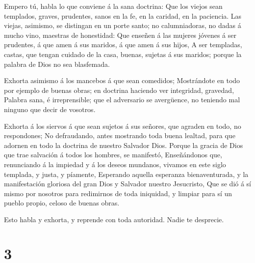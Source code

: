  Empero tú, habla lo que conviene á la sana doctrina:
 Que los viejos sean templados, graves, prudentes, sanos en
la fe, en la caridad, en la paciencia.  Las viejas,
asimismo, se distingan en un porte santo; no calumniadoras, no dadas á
mucho vino, maestras de honestidad:  Que enseñen á las
mujeres jóvenes á ser prudentes, á que amen á sus maridos, á que amen á
sus hijos,  A ser templadas, castas, que tengan cuidado de
la casa, buenas, sujetas á sus maridos; porque la palabra de Dios no sea
blasfemada.

 Exhorta asimismo á los mancebos á que sean comedidos;
 Mostrándote en todo por ejemplo de buenas obras; en
doctrina haciendo ver integridad, gravedad,  Palabra sana, é
irreprensible; que el adversario se avergüence, no teniendo mal ninguno
que decir de vosotros.

 Exhorta á los siervos á que sean sujetos á sus señores, que
agraden en todo, no respondones;  No defraudando, antes
mostrando toda buena lealtad, para que adornen en todo la doctrina de
nuestro Salvador Dios.  Porque la gracia de Dios que trae
salvación á todos los hombres, se manifestó,  Enseñándonos
que, renunciando á la impiedad y á los deseos mundanos, vivamos en este
siglo templada, y justa, y píamente,  Esperando aquella
esperanza bienaventurada, y la manifestación gloriosa del gran Dios y
Salvador nuestro Jesucristo,  Que se dió á sí mismo por
nosotros para redimirnos de toda iniquidad, y limpiar para sí un pueblo
propio, celoso de buenas obras.

 Esto habla y exhorta, y reprende con toda autoridad. Nadie
te desprecie.

\hypertarget{section-2}{%
\section{3}\label{section-2}}

